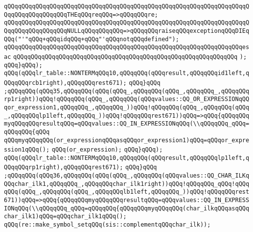 \verb|qQQqqQQqqQQqqQQqqQQqqQQqqQQqqQQqqQQqqQQqqQQqqQQqqQQqqQQqqQQqqQQqqQQqqQQqqQQqqQQqqQQqqQQqTHEqQQqreqQQq=>qQQqqQQqre;|\newline
\verb|qQQqqQQqqQQqqQQqqQQqqQQqqQQqqQQqqQQqqQQqqQQqqQQqqQQqqQQqqQQqqQQqqQQqqQQqqQQqqQQqqQQqqQQqNULLqQQqqQQqqQQq=>qQQqqQQqraiseqQQqexceptionqQQqDIEqQQq("'"qQQq+qQQqidqQQq+qQQq"'qQQqnotqQQqdefined");|\newline
\verb|qQQqqQQqqQQqqQQqqQQqqQQqqQQqqQQqqQQqqQQqqQQqqQQqqQQqqQQqqQQqqQQqqQQqesac|\newline
\verb|qQQqqQQqqQQqqQQqqQQqqQQqqQQqqQQqqQQqqQQqqQQqqQQqqQQqqQQqqQQqqQQq|\newline
\verb|);|\newline
\verb|qQQq}qQQq);|\newline
\verb|qQQq(qQQqlr_table::NONTERMqQQq10,qQQqqQQq(qQQqresult,qQQqqQQqid1left,qQQqqQQqrcb1right),qQQqqQQqrest671);|\newline
\verb|qQQq}qQQq|\newline
\verb|;qQQqqQQq(qQQq35,qQQqqQQq(qQQq(qQQq_,qQQqqQQq(qQQq_,qQQqqQQq_,qQQqqQQqrp1right))qQQq!qQQqqQQq(qQQq_,qQQqqQQq(qQQqvalues::QQ_OR_EXPRESSIONqQQqor_expression1,qQQqqQQq_,qQQqqQQq_))qQQq!qQQqqQQq(qQQq_,qQQqqQQq(qQQq_,qQQqqQQqlp1left,qQQqqQQq_))qQQq!qQQqqQQqrest671))qQQq=>qQQq{qQQqqQQqmyqQQqqQQqresultqQQq=qQQqvalues::QQ_IN_EXPRESSIONqQQq(\\qQQqqQQq_qQQq=qQQqqQQq{qQQq|\newline
\verb|qQQqmyqQQqqQQq(or_expressionqQQqasqQQqor_expression1)qQQq=qQQqor_expression1qQQq();|\newline
\verb|qQQq(or_expression);|\newline
\verb|qQQq}qQQq);|\newline
\verb|qQQq(qQQqlr_table::NONTERMqQQq10,qQQqqQQq(qQQqresult,qQQqqQQqlp1left,qQQqqQQqrp1right),qQQqqQQqrest671);|\newline
\verb|qQQq}qQQq|\newline
\verb|;qQQqqQQq(qQQq36,qQQqqQQq(qQQq(qQQq_,qQQqqQQq(qQQqvalues::QQ_CHAR_ILKqQQqchar_ilk1,qQQqqQQq_,qQQqqQQqchar_ilk1right))qQQq!qQQqqQQq_qQQq!qQQqqQQq(qQQq_,qQQqqQQq(qQQq_,qQQqqQQqlb1left,qQQqqQQq_))qQQq!qQQqqQQqrest671))qQQq=>qQQq{qQQqqQQqmyqQQqqQQqresultqQQq=qQQqvalues::QQ_IN_EXPRESSIONqQQq(\\qQQqqQQq_qQQq=qQQqqQQq{qQQqqQQqmyqQQqqQQq(char_ilkqQQqasqQQq|\newline
\verb|char_ilk1)qQQq=qQQqchar_ilk1qQQq();|\newline
\verb|qQQq(re::make_symbol_setqQQq(sis::complementqQQqchar_ilk));|\newline
